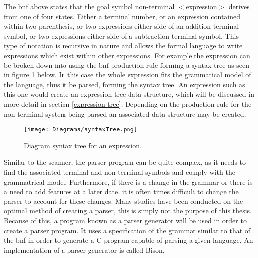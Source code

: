 \noindent
The \acrshort{bnf} above states that the goal symbol non-terminal $<$expression$>$ derives from one of four states. Either a terminal number, or an expression contained within two parenthesis, or two expressions either side of an addition terminal symbol, or two expressions either side of a subtraction terminal symbol. This type of notation is recursive in nature and allows the formal language to write expressions which exist within other expressions. For example the expression  can be broken down into using the \acrshort{bnf} production rule forming a syntax tree as seen in figure \ref{syntax tree} below. In this case the whole expression fits the grammatical model of the language, thus it be parsed, forming the syntax tree. An expression such as this one would create an expression tree data structure, which will be discussed in more detail in section \ref{expression tree}. Depending on the production rule for the non-terminal system being parsed an associated data structure may be created.

\begin{figure}[htbp]
	{\centering
		\vspace{7px}
		
		\texttt{[image: Diagrams/syntaxTree.png]}
		
		\caption{Diagram syntax tree for an expression.} \label{syntax tree}
	}
\end{figure}
\FloatBarrier

\noindent
Similar to the scanner, the parser program can be quite complex, as it needs to find the associated terminal and non-terminal symbols and comply with the grammatrical model. Furthermore, if there is a change in the grammar or there is a need to add features at a later date, it is often times difficult to change the parser to account for these changes. Many studies have been conducted on the optimal method of creating a parser, this is simply not the purpose of this thesis. Because of this, a program known as a parser generator will be used in order to create a parser program. It uses a specification of the grammar similar to that of the \acrshort{bnf} in order to generate a C program capable of parsing a given language. An implementation of a parser generator is called Bison.

